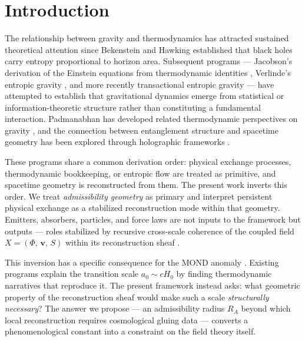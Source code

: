 \documentclass[11pt, a4paper]{article}
\theoremstyle{plain}
\theoremstyle{definition}
\theoremstyle{remark}
\newcommand{\Xfield}{X = (\Phi,\,\mathbf{v},\,S)}
\newcommand{\RA}{R_{\!A}}
\begin{document}
\newpage
\tableofcontents
\newpage

\section{Introduction}

The relationship between gravity and thermodynamics has attracted sustained
theoretical attention since Bekenstein and Hawking established that black holes carry
entropy proportional to horizon area. Subsequent programs --- Jacobson's derivation
of the Einstein equations from thermodynamic identities \cite{jacobson1995,jacobson2016},
Verlinde's entropic gravity \cite{verlinde2011,verlinde2017}, and more recently
transactional entropic gravity \cite{kastner2024} --- have attempted to establish
that gravitational dynamics emerge from statistical or information-theoretic structure
rather than constituting a fundamental interaction. Padmanabhan has developed related
thermodynamic perspectives on gravity \cite{padmanabhan2010}, and the connection
between entanglement structure and spacetime geometry has been explored through
holographic frameworks \cite{vanraamsdonk2010,swingle2012}.

These programs share a common derivation order: physical exchange processes,
thermodynamic bookkeeping, or entropic flow are treated as primitive, and spacetime
geometry is reconstructed from them. The present work inverts this order. We treat
\emph{admissibility geometry} as primary and interpret persistent physical exchange
as a stabilized reconstruction mode within that geometry. Emitters, absorbers,
particles, and force laws are not inputs to the framework but outputs --- roles
stabilized by recursive cross-scale coherence of the coupled field $\Xfield$ within
its reconstruction sheaf \cite{bredon1997,maclane1992}.

This inversion has a specific consequence for the MOND anomaly
\cite{milgrom1983,famaey2012}. Existing programs explain the transition scale
$a_0 \sim cH_0$ by finding thermodynamic narratives that reproduce it. The present
framework instead asks: what geometric property of the reconstruction sheaf would
make such a scale \emph{structurally necessary}? The answer we propose --- an
admissibility radius $\RA$ beyond which local reconstruction requires cosmological
gluing data --- converts a phenomenological constant into a constraint on the field
theory itself.
\end{document}
